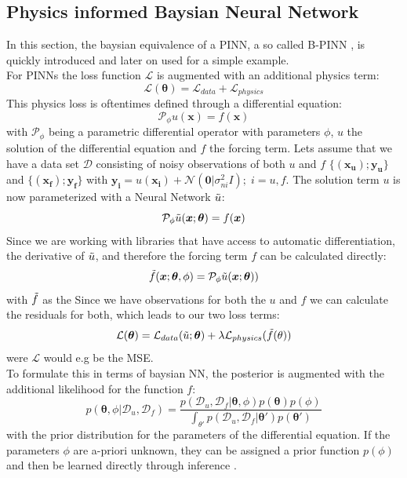 \documentclass{article}
\begin{document}
\subsection{Physics informed Baysian Neural Network}
In this section, the baysian equivalence of a PINN, a so called B-PINN \cite{Yang_2021}, is quickly introduced and later on used for a simple example. \\
For PINNs the loss function $\mathcal{L}$ is augmented with an additional physics term:
\begin{equation}
    \mathcal{L}(\bm \theta) = \mathcal{L}_{data} + \mathcal{L}_{physics}
\end{equation}
This physics loss is oftentimes defined through a differential equation:
\begin{equation}
    \mathcal{P}_\phi u(\bm x) = f(\bm x)
\end{equation}
with $\mathcal{P}_\phi$ being a parametric differential operator with parameters $\phi$, $u$ the solution of the differential equation and $f$ the forcing term. Lets assume that we have a data set $\mathcal{D}$ consisting of noisy observations of both $u$ and $f$ $\{(\bm{x_u});\bm{y_u}\}$ and $\{(\bm{x_f});\bm{y_f}\}$ with $\bm{y_i} = u(\bm{x_i}) + \mathcal{N}(\bm{0}|\sigma_{ni}^2 I) ; \; i = u,f$. The solution term $u$ is now parameterized with a Neural Network $\Tilde{u}$:
\begin{equation}
    \mathcal{P}_\phi \Tilde{u}(\bm x; \bm \theta) = f(\bm x)
\end{equation}
Since we are working with libraries that have access to automatic differentiation, the derivative of $\Tilde{u}$, and therefore the forcing term $f$ can be calculated directly:
\begin{equation}
    \Tilde{f}(\bm x;\bm \theta, \phi) = \mathcal{P}_\phi \Tilde{u}(\bm x; \bm \theta))
\end{equation}
with $ \Tilde{f}$ as the 
Since we have observations for both the $u$ and $f$ we can calculate the residuals for both, which leads to our two loss terms:
\begin{equation}
    \mathcal{L}(\bm \theta) = \mathcal{L}_{data}(\Tilde{u}; \bm \theta) + \lambda \mathcal{L}_{physics}(\Tilde{f}(\theta))
\end{equation}
were $\mathcal{L}$ would e.g be the MSE.\\
To formulate this in terms of baysian NN, the posterior is augmented with the additional likelihood for the function $f$:
\begin{equation} \label{eq:post_params_BPINN}
    p(\bm \theta, \phi|\mathcal{D}_u, \mathcal{D}_f) = \frac{p(\mathcal{D}_u, \mathcal{D}_f|\bm \theta, \phi)p(\bm \theta)p(\phi)}{\int_{\theta'}p(\mathcal{D}_u, \mathcal{D}_f|\bm \theta')p(\bm \theta')}
\end{equation}
with the prior distribution for the parameters of the differential equation. If the parameters $\phi$ are a-priori unknown, they can be assigned a prior function $p(\phi)$ and then be learned directly through inference \cite{raissi2017physicsIDL, Yang_2021}.
\end{document}
